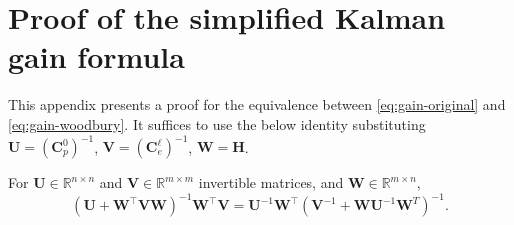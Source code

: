 \chapter{Proof of the simplified Kalman gain formula}
\label{appendix:woodbury}

This appendix presents a proof for the equivalence between \cref{eq:gain-original} and \cref{eq:gain-woodbury}.
It suffices to use the below identity substituting 
%
$\mathbf{U} = (\mathbf{C}^0_p)^{-1}$,
$\mathbf{V} = (\mathbf{C}^\ell_e)^{-1}$,
$\mathbf{W} = \mathbf{H}$.
%
\begin{theorem}
\label{theo:woodbury}
    For $\mathbf{U}\in\mathbb{R}^{n\times n}$ and 
    $\mathbf{V}\in\mathbb{R}^{m\times m}$ invertible matrices,
    and 
    $\mathbf{W}\in\mathbb{R}^{m\times n}$,
    \begin{equation}
        (\mathbf{U} + \mathbf{W}^\top\mathbf{V}\mathbf{W})^{-1} 
        \mathbf{W}^\top\mathbf{V}
        =
        \mathbf{U}^{-1}\mathbf{W}^\top
        (\mathbf{V}^{-1} + \mathbf{W}\mathbf{U}^{-1}\mathbf{W}^T)^{-1}.
    \end{equation}
\end{theorem}
%
